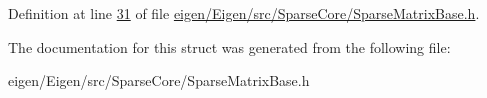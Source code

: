 Definition at line \hyperlink{eigen_2_eigen_2src_2_sparse_core_2_sparse_matrix_base_8h_source_l00031}{31} of file \hyperlink{eigen_2_eigen_2src_2_sparse_core_2_sparse_matrix_base_8h_source}{eigen/\+Eigen/src/\+Sparse\+Core/\+Sparse\+Matrix\+Base.\+h}.



The documentation for this struct was generated from the following file\+:\begin{DoxyCompactItemize}
\item 
eigen/\+Eigen/src/\+Sparse\+Core/\+Sparse\+Matrix\+Base.\+h\end{DoxyCompactItemize}
